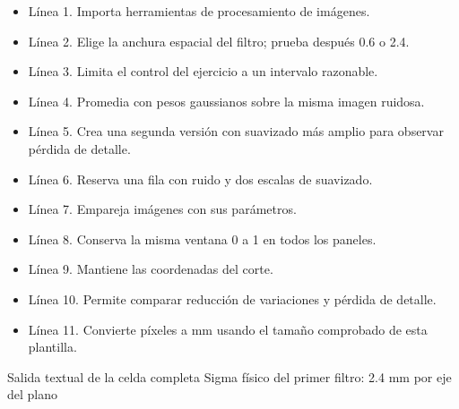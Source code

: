 \begin{itemize}

\item Línea 1. Importa herramientas de procesamiento de imágenes.

\item Línea 2. Elige la anchura espacial del filtro; prueba después 0.6 o 2.4.

\item Línea 3. Limita el control del ejercicio a un intervalo razonable.

\item Línea 4. Promedia con pesos gaussianos sobre la misma imagen ruidosa.

\item Línea 5. Crea una segunda versión con suavizado más amplio para observar pérdida de detalle.

\item Línea 6. Reserva una fila con ruido y dos escalas de suavizado.

\item Línea 7. Empareja imágenes con sus parámetros.

\item Línea 8. Conserva la misma ventana 0 a 1 en todos los paneles.

\item Línea 9. Mantiene las coordenadas del corte.

\item Línea 10. Permite comparar reducción de variaciones y pérdida de detalle.

\item Línea 11. Convierte píxeles a mm usando el tamaño comprobado de esta plantilla.

\end{itemize}

\begin{Salida}{Salida textual de la celda completa}
Sigma físico del primer filtro: 2.4 mm por eje del plano
\end{Salida}



